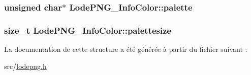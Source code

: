 \subsubsection[{palette}]{\setlength{\rightskip}{0pt plus 5cm}unsigned char$\ast$ Lode\+P\+N\+G\+\_\+\+Info\+Color\+::palette}\label{struct_lode_p_n_g___info_color_ac6de7ff58cb1f39a73567abb826f72f5}
\hypertarget{struct_lode_p_n_g___info_color_a49842a304ffd0abc8aa791030c5fa5dd}{}
\subsubsection[{palettesize}]{\setlength{\rightskip}{0pt plus 5cm}size\+\_\+t Lode\+P\+N\+G\+\_\+\+Info\+Color\+::palettesize}\label{struct_lode_p_n_g___info_color_a49842a304ffd0abc8aa791030c5fa5dd}


La documentation de cette structure a été générée à partir du fichier suivant \+:\begin{DoxyCompactItemize}
\item 
src/\hyperlink{lodepng_8h}{lodepng.\+h}\end{DoxyCompactItemize}
